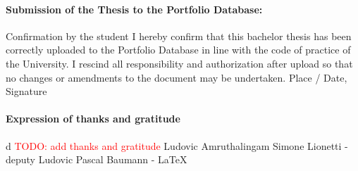 \documentclass[a4paper,10.5pt,
			   bindingoffset=0.2in,left=3.35cm,right=2.12cm,top=3.75cm,bottom=2.88cm,%
				footskip=.25in
				listof=numbered,toc=chapterentrywithdots]{scrreport}
\renewcommand{\todo}[1]{\textcolor{red}{TODO: #1}}
\begin{document}
	\paragraph{\textbf{Submission of the Thesis to the Portfolio Database:}}
	Confirmation by the student \newline
	I hereby confirm that this bachelor thesis has been correctly uploaded to the Portfolio Database in line with the code of practice of the University. I rescind all responsibility and authorization after upload so that no changes or amendments to the document may be undertaken.  \newline \newline
	Place / Date, Signature	\underline{\hspace*{8cm}} \newline \newline
	
	\newpage
	\paragraph{\textbf{Expression of thanks and gratitude}}
	d\newline
	\todo{add thanks and gratitude}
	Ludovic Amruthalingam
	Simone Lionetti - deputy Ludovic
	Pascal Baumann - LaTeX
	
	\begin{abstract}
		\todo{Your abstract here.}
	\end{abstract}
	
	\tableofcontents
	\listoftodos
	
\end{document}
